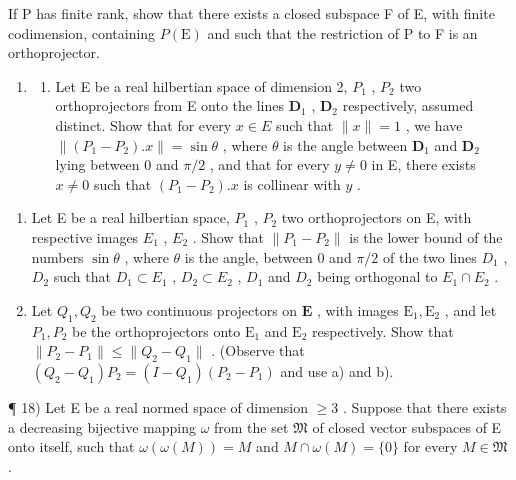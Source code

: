 If P has finite rank, show that there exists a closed subspace F of E, with finite codimension, containing \(P(\mathrm{E})\) and such that the restriction of P to F is an orthoprojector.

\begin{enumerate}
\def\labelenumi{\arabic{enumi})}
\setcounter{enumi}{16}
\tightlist
\item
  \begin{enumerate}
  \def\labelenumii{\alph{enumii})}
  \tightlist
  \item
    Let E be a real hilbertian space of dimension 2, \(P_1\) , \(P_2\) two orthoprojectors from E onto the lines \(\mathbf{D}_1\) , \(\mathbf{D}_2\) respectively, assumed distinct. Show that for every \(x \in E\) such that \(\| x \| = 1\) , we have \(\| (P_1 - P_2).x \| = \sin \theta\) , where \(\theta\) is the angle between \(\mathbf{D}_1\) and \(\mathbf{D}_2\) lying between 0 and \(\pi/2\) , and that for every \(y \neq 0\) in E, there exists \(x \neq 0\) such that \((P_1 - P_2).x\) is collinear with \(y\) .
  \end{enumerate}
\end{enumerate}

\begin{enumerate}
\def\labelenumi{\alph{enumi})}
\setcounter{enumi}{1}
\item
  Let E be a real hilbertian space, \(P_{1}\) , \(P_{2}\) two orthoprojectors on E, with respective images \(E_{1}\) , \(E_{2}\) . Show that \(\|P_{1}-P_{2}\|\) is the lower bound of the numbers \(\sin\theta\) , where \(\theta\) is the angle, between 0 and \(\pi/2\) of the two lines \(D_{1}\) , \(D_{2}\) such that \(D_{1}\subset E_{1}\) , \(D_{2}\subset E_{2}\) , \(D_{1}\) and \(D_{2}\) being orthogonal to \(E_{1}\cap E_{2}\) .
\item
  Let \(Q_{1}, Q_{2}\) be two continuous projectors on \(\mathbf{E}\) , with images \(\mathrm{E}_1, \mathrm{E}_2\) , and let \(P_{1}, P_{2}\) be the orthoprojectors onto \(\mathrm{E}_1\) and \(\mathrm{E}_2\) respectively. Show that \(\| P_2 - P_1 \| \leqslant \| Q_2 - Q_1 \|\) . (Observe that \((Q_2 - Q_1)P_2 = (I - Q_1)(P_2 - P_1)\) and use a) and b).
\end{enumerate}

¶ 18) Let E be a real normed space of dimension \(\geqslant 3\) . Suppose that there exists a decreasing bijective mapping \(\omega\) from the set \(\mathfrak{M}\) of closed vector subspaces of E onto itself, such that \(\omega(\omega(M)) = M\) and \(M \cap \omega(M) = \{0\}\) for every \(M \in \mathfrak{M}\) .

